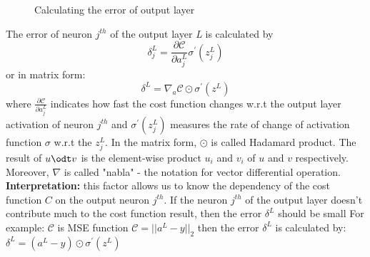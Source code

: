 \begin{figure}[H]
\centering
\caption{Calculating the error of output layer}
\end{figure}

The error of neuron \textit{$j^{th}$} of the output layer \textit{L} is calculated by
\begin{equation}
    \delta^{L}_{j} = \frac{\partial \mathcal{C}}{\partial a^{L}_{j}} \sigma^{'}(z^{L}_{j})
\end{equation}
or in matrix form:
\begin{equation}\label{eq:erroroutput}
    \delta^{L} = \nabla_{a} \mathcal{C}\odot \sigma^{'}(z^{L})
\end{equation}
where $\frac{\partial \mathcal{C}}{\partial a^{L}_{j}}$ indicates how fast the cost function changes w.r.t the output layer activation of neuron \textit{$j^{th}$}
and $\sigma^{'}(z^{L}_{j})$ measures the rate of change of activation function $\sigma$ w.r.t the $z^{L}_{j}$. In the matrix form, $\odot$ is called Hadamard product. The result of $u \odt v$ is the element-wise product $u_{i}$ and $v_{i}$ of $u$ and $v$ respectively. Moreover, $\nabla$ is called "nabla" - the notation for vector differential operation.\newline
\newline\noindent
\textbf{Interpretation:} this factor allows us to know the dependency of the cost function $C$ on the output neuron $j^{th}$. If the neuron $j^{th}$ of the output layer doesn't contribute much to the cost function result, then the error $\delta^{L}$ should be small\newline
\newline
For example: $\mathcal{C}$ is MSE function $\mathcal{C} = || a^{L} - y||_{2}$ then the error $\delta^{L}$ is calculated by: $\delta^{L} = (a^{L} - y) \odot \sigma^{'}(z^{L})$\newline

